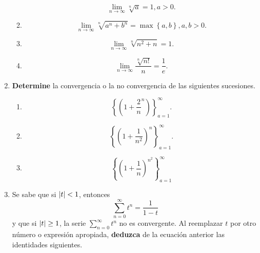 \documentclass[12pt]{article}
\begin{document}
\begin{enumerate}
\begin{multicols}{2}
\begin{enumerate}
\begin{equation*}
                \lim_{n\rightarrow\infty}\sqrt[n]{a}=1, a>0.
            \end{equation*}
            \item \begin{equation*}
                \lim_{n\rightarrow\infty}\sqrt[n]{a^n+b^n}=\max\left\{a,b\right\}, a,b>0.
            \end{equation*}
            \item \begin{equation*}
                \lim_{n\rightarrow\infty}\sqrt[n]{n^2+n}=1.
            \end{equation*}
            \item \begin{equation*}
                \lim_{n\rightarrow\infty} \frac{\sqrt[n]{n!}}{n}=\frac{1}{e}.
            \end{equation*}
        \end{enumerate}
    \end{multicols}
    \item \textbf{Determine} la convergencia o la no convergencia de las siguientes sucesiones.
    \begin{multicols}{3}
        \begin{enumerate}
            \item \begin{equation*}
                \left\{\left(1+\frac{2}{n}^n\right)\right\}_{a=1}^{\infty}.
            \end{equation*}
            \item \begin{equation*}
                \left\{\left(1+\frac{1}{n^2}\right)^n\right\}_{a=1}^{\infty}.
            \end{equation*}
            \item \begin{equation*}
                \left\{\left(1+\frac{1}{n}\right)^{n^2}\right\}_{a=1}^{\infty}
            \end{equation*}
        \end{enumerate}
    \end{multicols}
    \item Se sabe que si $\left| t \right|<1$, entonces
    \begin{equation*}
        \sum_{n=0}^{\infty}t^n=\frac{1}{1-t}
    \end{equation*}
    y que si $\left| t \right|\geq1$, la serie $\sum_{n=0}^{\infty}t^n$ no es convergente. Al reemplazar $t$ por otro número o expresión apropiada, \textbf{deduzca} de la ecuación anterior las identidades siguientes.

\end{enumerate}
\end{document}
